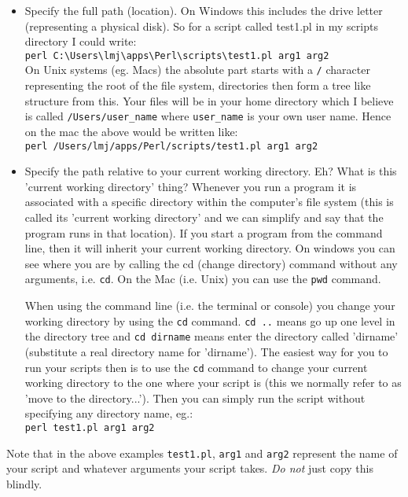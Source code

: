 \documentclass[11pt]{article}
\begin{document}
\begin{itemize}
  \item Specify the full path (location). On Windows this includes the drive letter (representing a physical
    disk). So for a script called test1.pl in my scripts directory I could write:\\
    \verb|perl C:\Users\lmj\apps\Perl\scripts\test1.pl arg1 arg2|\\
    On Unix systems (eg. Macs) the absolute part starts with a \texttt{/} character representing
    the root of the file system, directories then form a tree like structure from this. Your
    files will be in your home directory which I believe is called \texttt{/Users/user\_name} where
    \texttt{user\_name} is your own user name. Hence on the mac the above would be written like:\\
    \verb|perl /Users/lmj/apps/Perl/scripts/test1.pl arg1 arg2|
  \item Specify the path relative to your current working directory. Eh? What is this 'current working directory'
    thing? Whenever you run a program it is associated with a specific directory within
    the computer's file system (this is called its 'current working directory' and we can simplify and say
    that the program runs in that location). If you start a program from the command line, then it will
    inherit your current working directory. On windows you can see where you are by calling the
    cd (change directory) command without any arguments, i.e. \texttt{cd}. On the Mac (i.e. Unix) you can use the \texttt{pwd} command.

    When using the command line (i.e. the terminal or console) you change your working directory by using the \texttt{cd} command. \texttt{cd ..}
    means go up one level in the directory tree and \texttt{cd dirname} means enter the directory
    called 'dirname' (substitute a real directory name for 'dirname'). The easiest way for you to run your
    scripts then is to use the \texttt{cd} command to change your current working directory to
    the one where your script is (this we normally refer to as 'move to the directory...'). Then you can
    simply run the script without specifying any directory name, eg.:\\
    \texttt{perl test1.pl arg1 arg2}
\end{itemize}
Note that in the above examples \texttt{test1.pl}, \texttt{arg1} and \texttt{arg2} represent the name of your script and whatever arguments your
script takes. \emph{Do not} just copy this blindly.
\end{document}
